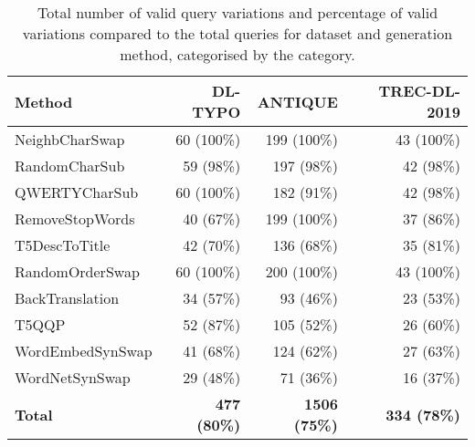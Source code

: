\begin{table}[ht]
\centering
\caption{Total number of valid query variations and percentage of valid variations compared to the total queries for dataset and generation method, categorised by the category.}
\label{tab:valid-vars}
\begin{tabularx}{\columnwidth}{X|r|r|r}
\textbf{Method}  & \textbf{DL-TYPO}    & \textbf{ANTIQUE}   & \textbf{TREC-DL-2019} \\ \hline
NeighbCharSwap   & 60 (100\%)          & 199 (100\%)        & 43 (100\%)            \\
RandomCharSub    & 59 (98\%)           & 197 (98\%)         & 42 (98\%)             \\
QWERTYCharSub    & 60 (100\%)          & 182 (91\%)         & 42 (98\%)             \\ \hline
RemoveStopWords  & 40 (67\%)           & 199 (100\%)        & 37 (86\%)             \\
T5DescToTitle    & 42 (70\%)           & 136 (68\%)         & 35 (81\%)             \\ \hline
RandomOrderSwap  & 60 (100\%)          & 200 (100\%)        & 43 (100\%)            \\ \hline
BackTranslation  & 34 (57\%)           & 93 (46\%)          & 23 (53\%)             \\
T5QQP            & 52 (87\%)           & 105 (52\%)         & 26 (60\%)             \\
WordEmbedSynSwap & 41 (68\%)           & 124 (62\%)         & 27 (63\%)             \\
WordNetSynSwap   & 29 (48\%)           & 71 (36\%)          & 16 (37\%)             \\ \hline
\textbf{Total}   & \textbf{477 (80\%)} & \textbf{1506 (75\%)} & \textbf{334 (78\%)}     \\ \hline
\end{tabularx}%
\end{table}
